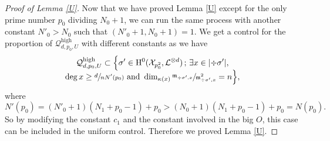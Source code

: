 \documentclass[JEP,XML,SOM,Unicode,published]{cedram}
\newcommand{\sep}{\,;\,}
\theoremstyle{plain}
\theoremstyle{definition}
\newcommand{\ho}{\mathrm{H}}
\newcommand{\m}{\mathfrak{m}}
\newcommand{\X}{\mathcal{X}}
\newcommand{\li}{\mathcal{L}}
\begin{document}
\begin{proof}[Proof of Lemma \ref{U}]
Now that we have proved Lemma \ref{U} except for the only prime number $p_0$ dividing $N_0+1$, we can run the same process with another constant $N'_0> N_0$ such that $(N'_0+1,N_0+1)=1$. We get a control for the proportion of $\mathcal{Q}_{d,p_0,U}^{\mathrm{high}}$ with different constants as we have
\begin{multline*}
\mathcal{Q}_{d,p_0,U}^{\mathrm{high}}\subset \Bigl\{ \sigma'\in \ho^0(\X_{p_0^2}, \li^{\otimes d})\sep \exists x\in |{\div\sigma'}|,\\[-5pt]\deg x\geq \sfrac{d}{nN'(p_0)}\text{ and } \dim_{\kappa(x)}\sfrac{\m_{\div \sigma',x}}{\m^2_{\div \sigma', x}}=n \Bigr\},
\end{multline*}
where
\[
N'(p_0)=(N'_0+1)(N_1+p_0-1)+p_0>(N_0+1)(N_1+p_0-1)+p_0=N(p_0).
\]
So by modifying the constant $c_1$ and the constant involved in the big $O$, this case can be included in the uniform control. Therefore we proved Lemma \ref{U}.
\end{proof}
\end{document}
